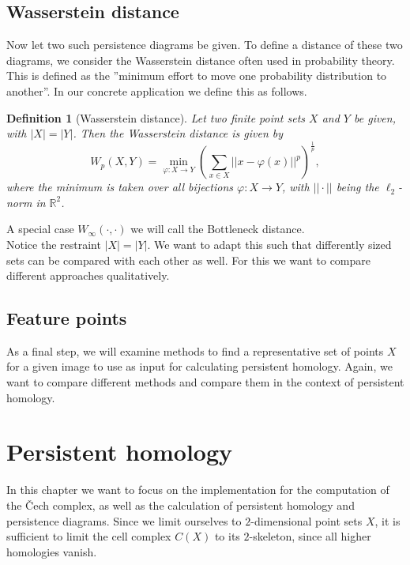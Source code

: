 \documentclass[11pt, a4paper, UKenglish]{article}
\newtheorem{definition}{Definition}
\newcommand{\bR}{\mathbb{R}}
\begin{document}
    \subsection{Wasserstein distance}\label{subsec:wasserstein-distance}

    Now let two such persistence diagrams be given.
    To define a distance of these two diagrams, we consider the Wasserstein distance often used in probability theory.
    This is defined as the ''minimum effort to move one probability distribution to another''.
    In our concrete application we define this as follows.
    \begin{definition}[Wasserstein distance]
        Let two finite point sets $X$ and $Y$ be given, with $|X|=|Y|$.
        Then the Wasserstein distance is given by\[W_p(X,Y) = \min_{\varphi:X\rightarrow Y}\left(\sum_{x\in X}||x-\varphi(x)||^p\right)^{\frac{1}{p}},\]
        where the minimum is taken over all bijections $\varphi:X\rightarrow Y$, with $||\cdot||$ being the $\ell_2$-norm in $\bR^2$.
    \end{definition}
    A special case $W_\infty(\cdot,\cdot)$ we will call the Bottleneck distance.\\
    Notice the restraint $|X| = |Y|$.
    We want to adapt this such that differently sized sets can be compared with each other as well.
    For this we want to compare different approaches qualitatively.

    \subsection{Feature points}\label{subsec:feature-proposals}

    As a final step, we will examine methods to find a representative set of points $X$ for a given image to use as input for calculating persistent homology.
    Again, we want to compare different methods and compare them in the context of persistent homology.
    \section{Persistent homology}\label{sec:persistent-homology2}

    In this chapter we want to focus on the implementation for the computation of the Čech complex, as well as the calculation of persistent homology and persistence diagrams. Since we limit ourselves to $2$-dimensional point sets $X$, it is sufficient to limit the cell complex $C(X)$ to its $2$-skeleton, since all higher homologies vanish.
\end{document}
